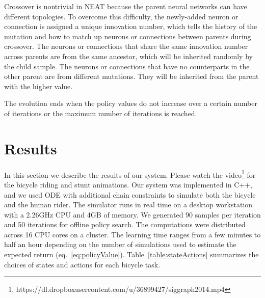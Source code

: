 Crossover is nontrivial in NEAT because the parent neural networks can have different topologies. To overcome this difficulty, the newly-added neuron or connection is assigned a unique innovation number, which tells the history of the mutation and how to match up neurons or connections between parents during crossover. The neurons or connections that share the same innovation number across parents are from the same ancestor, which will be inherited randomly by the child sample. The neurons or connections that have no counterparts in the other parent are from different mutations. They will be inherited from the parent with the higher value.

The evolution ends when the policy values do not increase over a certain number of iterations or the maximum number of iterations is reached.

\section{Results}
\label{sec:results}

In this section we describe the results of our system. Please watch the video\footnote{https://dl.dropboxusercontent.com/u/36899427/siggraph2014.mp4} for the bicycle riding and stunt
animations. Our system was implemented in C++, and we used ODE with additional chain constraints to simulate both the bicycle and the human rider. The simulator runs in real time on a desktop workstation with a 2.26GHz CPU and 4GB of memory. We generated 90 samples per iteration and 50 iterations for offline policy search. The computations were distributed across 16 CPU cores on a cluster. The learning time ranges from a few minutes to half an hour depending on the number of simulations used to estimate the expected return (eq.~\ref{eq:policyValue}). Table~\ref{table:stateActions} summarizes the choices of states and actions for each bicycle task.

